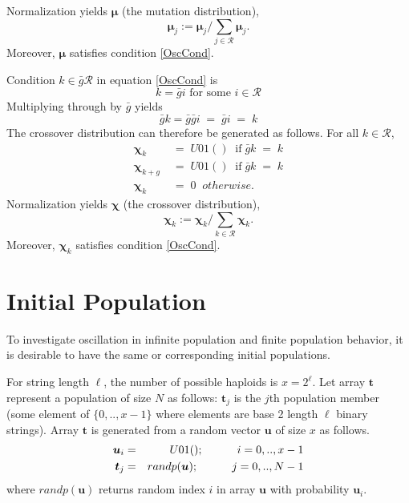 Normalization yields $\bm{\mu}$ (the mutation distribution),
\[
\bm{\mu}_j := \bm{\mu}_j / \sum \limits_{j \in \mathcal{R} } \bm{\mu}_j.
\]
Moreover, $\bm{\mu}$ satisfies condition \ref{OscCond}.

Condition $k \in \bar{g} \mathcal{R}$ in equation \ref{OscCond} is
\[
k = \bar{g} i  \text{ for some $i \in \mathcal{R}$}
\]
Multiplying through by $\bar{g}$ yields
\begin{equation*}
\bar{g} k = \bar{g} \bar{g} i \; = \; \bar{g} i \; = \; k 
\end{equation*}
The crossover distribution can therefore be generated as follows.
For all $k \in \mathcal{R}$,
\begin{equation}
\label{ChiDist}
\begin{split}
\bm{\chi}_k & \;=\;  U01() \;\; \mbox{if}\; \bar{g}k \;=\; k \\
\bm{\chi}_{k+g} & \;=\;  U01() \;\; \mbox{if}\; \bar{g}k \;=\; k\\
\bm{\chi}_k & \;=\;  0  \;\; otherwise.
\end{split}
\end{equation} 
Normalization yields 
$\bm{\chi}$ (the crossover distribution),
\[
\bm{\chi}_k := \bm{\chi}_k/\sum\limits_{k \in \mathcal{R}} \bm{\chi}_k.
\]
Moreover, $\bm{\chi}_k$ satisfies condition \ref{OscCond}.

\section{Initial Population}
\label{InitPopOsc}

To investigate oscillation in infinite population and finite population behavior, 
it is desirable to have the same or corresponding initial populations. 

For string length $\ell$, the number of possible haploids is $x = 2^\ell$. Let array $\bm{t}$ represent a  
population of size $N$ as follows: $\bm{t}_j$ is the $j$th population member (some element of $\{0,..,x-1\}$ 
where elements are base 2 length $\ell$ binary strings). Array $\bm{t}$ is generated from a random vector $\bm{u}$ of size $x$ as follows. 
\begin{eqnarray*}
\bm{u}_i & = & U01(); \hspace{30pt} {i = 0,.., x-1} \\
\bm{t}_j & = & randp(\bm{u}) ; \hspace{30pt} {j = 0,.., N-1}
\end{eqnarray*}
where $randp(\bm{u})$ returns random index $i$ in array $\bm{u}$ with probability $\bm{u}_i$.

